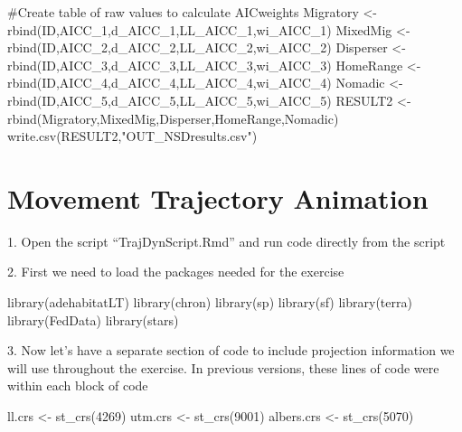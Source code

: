 \documentclass[
  letterpaper,
]{book}
\newenvironment{Shaded}{\begin{snugshade}}{\end{snugshade}}
\newcommand{\CommentTok}[1]{\textcolor[rgb]{0.37,0.37,0.37}{#1}}
\newcommand{\DecValTok}[1]{\textcolor[rgb]{0.68,0.00,0.00}{#1}}
\newcommand{\FunctionTok}[1]{\textcolor[rgb]{0.28,0.35,0.67}{#1}}
\newcommand{\NormalTok}[1]{\textcolor[rgb]{0.00,0.23,0.31}{#1}}
\newcommand{\OtherTok}[1]{\textcolor[rgb]{0.00,0.23,0.31}{#1}}
\newcommand{\StringTok}[1]{\textcolor[rgb]{0.13,0.47,0.30}{#1}}
\begin{document}
\begin{Shaded}
\begin{Highlighting}[]
\CommentTok{\#Create table of raw values to calculate AICweights}
\NormalTok{Migratory }\OtherTok{\textless{}{-}} \FunctionTok{rbind}\NormalTok{(ID,AICC\_1,d\_AICC\_1,LL\_AICC\_1,wi\_AICC\_1)}
\NormalTok{MixedMig }\OtherTok{\textless{}{-}} \FunctionTok{rbind}\NormalTok{(ID,AICC\_2,d\_AICC\_2,LL\_AICC\_2,wi\_AICC\_2)}
\NormalTok{Disperser }\OtherTok{\textless{}{-}} \FunctionTok{rbind}\NormalTok{(ID,AICC\_3,d\_AICC\_3,LL\_AICC\_3,wi\_AICC\_3)}
\NormalTok{HomeRange }\OtherTok{\textless{}{-}} \FunctionTok{rbind}\NormalTok{(ID,AICC\_4,d\_AICC\_4,LL\_AICC\_4,wi\_AICC\_4)}
\NormalTok{Nomadic }\OtherTok{\textless{}{-}} \FunctionTok{rbind}\NormalTok{(ID,AICC\_5,d\_AICC\_5,LL\_AICC\_5,wi\_AICC\_5)}
\NormalTok{RESULT2 }\OtherTok{\textless{}{-}} \FunctionTok{rbind}\NormalTok{(Migratory,MixedMig,Disperser,HomeRange,Nomadic)}
\FunctionTok{write.csv}\NormalTok{(RESULT2,}\StringTok{"OUT\_NSDresults.csv"}\NormalTok{)}
\end{Highlighting}
\end{Shaded}

\hypertarget{movement-trajectory-animation}{%
\chapter{Movement Trajectory
Animation}\label{movement-trajectory-animation}}

1. Open the script ``TrajDynScript.Rmd'' and run code directly from the
script

2. First we need to load the packages needed for the exercise

\begin{Shaded}
\begin{Highlighting}[]
\FunctionTok{library}\NormalTok{(adehabitatLT)}
\FunctionTok{library}\NormalTok{(chron)}
\FunctionTok{library}\NormalTok{(sp)}
\FunctionTok{library}\NormalTok{(sf)}
\FunctionTok{library}\NormalTok{(terra)}
\FunctionTok{library}\NormalTok{(FedData)}
\FunctionTok{library}\NormalTok{(stars)}
\end{Highlighting}
\end{Shaded}

3. Now let's have a separate section of code to include projection
information we will use throughout the exercise. In previous versions,
these lines of code were within each block of code

\begin{Shaded}
\begin{Highlighting}[]
\NormalTok{ll.crs }\OtherTok{\textless{}{-}} \FunctionTok{st\_crs}\NormalTok{(}\DecValTok{4269}\NormalTok{)}
\NormalTok{utm.crs }\OtherTok{\textless{}{-}} \FunctionTok{st\_crs}\NormalTok{(}\DecValTok{9001}\NormalTok{)}
\NormalTok{albers.crs }\OtherTok{\textless{}{-}} \FunctionTok{st\_crs}\NormalTok{(}\DecValTok{5070}\NormalTok{)}
\end{Highlighting}
\end{Shaded}
\end{document}
